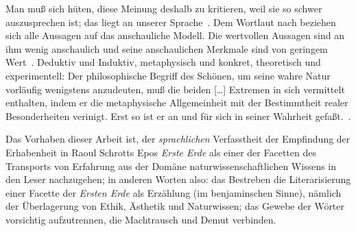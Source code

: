 \glqq Man muß sich hüten, diese Meinung deshalb zu kritieren, weil sie so
  schwer auszusprechen ist; das liegt an unserer Sprache\grqq\
  \citep{Schroedinger1935}. 
\glqq Dem Wortlaut nach beziehen sich alle Aussagen auf das anschauliche
  Modell. Die wertvollen Aussagen sind an ihm wenig anschaulich und seine
  anschaulichen Merkmale sind von geringem Wert\grqq\ \citep{Schroedinger1935}.
Deduktiv und Induktiv, metaphysisch und konkret, theoretisch und
  experimentell: \glqq Der philosophische Begriff des Schönen, um seine
  wahre Natur vorläufig wenigstens anzudeuten, muß die beiden [\ldots] Extremen
  in sich vermittelt enthalten, indem er die metaphysische 
  Allgemeinheit mit der Bestimmtheit realer Besonderheiten verinigt. Erst so ist
  er an und für sich in seiner Wahrheit gefaßt.\grqq\ \citep[S. 39]{Hegel1986}.

Das Vorhaben dieser Arbeit ist, der \emph{sprachlichen} Verfasstheit der Empfindung
  der Erhabenheit in Raoul Schrotts Epos \emph{Erste Erde} als einer der
  Facetten des Transports von Erfahrung aus der Domäne naturwissenschaftlichen
  Wissens in den Leser nachzugehen; in anderen Worten also: das Bestreben die
  Literarisierung einer Facette der \emph{Ersten Erde} als Erzählung (im
  benjaminschen Sinne), nämlich der Überlagerung von Ethik, Ästhetik und
  Naturwissen; das Gewebe der Wörter vorsichtig aufzutrennen, die Machtrausch
  und Demut verbinden.
